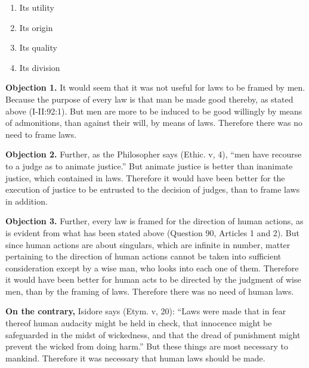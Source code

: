 
\begin{enumerate}

\item  Its utility 
\item  Its origin 
\item  Its quality 
\item  Its division 
\end{enumerate}


\textbf{Objection 1.} It would seem that it was not useful for laws to be framed by men. Because the purpose of every law is that man be made good thereby, as stated above (I-II:92:1). But men are more to be induced to be good willingly by means of admonitions, than against their will, by means of laws. Therefore there was no need to frame laws.

\textbf{Objection 2.} Further, as the Philosopher says (Ethic. v, 4), ``men have recourse to a judge as to animate justice.'' But animate justice is better than inanimate justice, which contained in laws. Therefore it would have been better for the execution of justice to be entrusted to the decision of judges, than to frame laws in addition.

\textbf{Objection 3.} Further, every law is framed for the direction of human actions, as is evident from what has been stated above (Question 90, Articles 1 and 2). But since human actions are about singulars, which are infinite in number, matter pertaining to the direction of human actions cannot be taken into sufficient consideration except by a wise man, who looks into each one of them. Therefore it would have been better for human acts to be directed by the judgment of wise men, than by the framing of laws. Therefore there was no need of human laws.

\textbf{On the contrary,} Isidore says (Etym. v, 20): ``Laws were made that in fear thereof human audacity might be held in check, that innocence might be safeguarded in the midst of wickedness, and that the dread of punishment might prevent the wicked from doing harm.'' But these things are most necessary to mankind. Therefore it was necessary that human laws should be made.

